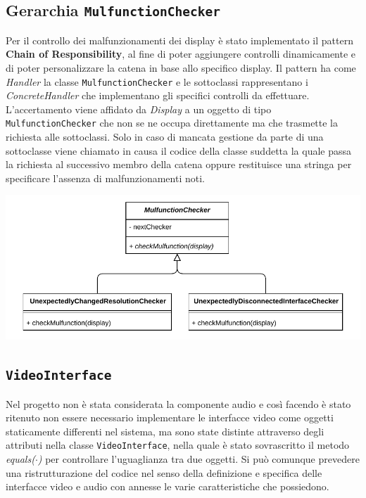 \documentclass[a4paper,11pt]{article}
\begin{document}
	\subsection{Gerarchia \texttt{MulfunctionChecker}}
	Per il controllo dei malfunzionamenti dei display è stato implementato il pattern \textbf{Chain of Responsibility}, al fine di poter aggiungere controlli dinamicamente e di poter personalizzare la catena in base allo specifico display. Il pattern ha come \textit{Handler} la classe \texttt{MulfunctionChecker} e le sottoclassi rappresentano i \textit{ConcreteHandler} che implementano gli specifici controlli da effettuare.\\
	L'accertamento viene affidato da \textit{Display} a un oggetto di tipo \texttt{MulfunctionChecker} che non se ne occupa direttamente ma che trasmette la richiesta alle sottoclassi. Solo in caso di mancata gestione da parte di una sottoclasse viene chiamato in causa il codice della classe suddetta la quale passa la richiesta al successivo membro della catena oppure restituisce una stringa per specificare l'assenza di malfunzionamenti noti.\\
	\begin{minipage}[c]{\textwidth}
		\centering
		\includegraphics[width=.5\textwidth]{diagramma/ClassDiagramm-MulfunctionChecker.pdf}
		\label{fig:mulfunction}
	\end{minipage}
	
	\subsection{\texttt{VideoInterface}}
	Nel progetto non è stata considerata la componente audio e così facendo è stato ritenuto non essere necessario implementare le interfacce video come oggetti staticamente differenti nel sistema, ma sono state distinte attraverso degli attributi nella classe \texttt{VideoInterface}, nella quale è stato sovrascritto il metodo \textit{equals($\cdot$)} per controllare l'uguaglianza tra due oggetti. Si può comunque prevedere una ristrutturazione del codice nel senso della definizione e specifica delle interfacce video e audio con annesse le varie caratteristiche che possiedono.\\
	
\end{document}
